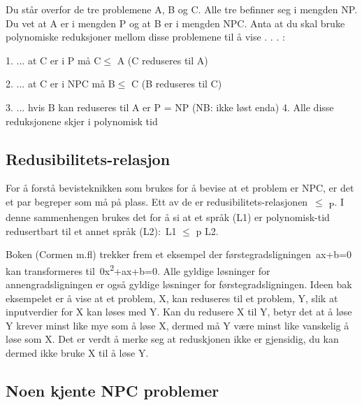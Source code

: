 \documentclass[12pt]{report}
\begin{document}

\par

Du står overfor de tre problemene A, B og C. Alle tre befinner seg i mengden NP. Du vet at A er i mengden P og at B er i mengden NPC. Anta at du skal bruke polynomiske reduksjoner mellom disse problemene til å vise . . . :\par

1. ... at C er i P må C$ \leq $ A (C reduseres til A)\par

2. ... at C er i NPC må B$ \leq $ C (B reduseres til C)\par

3. ... hvis B kan reduseres til A er P = NP (NB: ikke løst enda) 4. Alle disse reduksjonene skjer i polynomisk tid\par

\subsection*{Redusibilitets-relasjon}
For å forstå bevisteknikken som brukes for å bevise at et problem er NPC, er det et par begreper som må på plass. Ett av de er redusibilitets-relasjonen $ \leq $ \textsubscript{P}. I denne sammenhengen brukes det for å si at et språk (L1) er polynomisk-tid redusertbart til et annet språk (L2): L1 $ \leq $ p L2.\par

Boken (Cormen m.fl) trekker frem et eksempel der førstegradsligningen ax+b=0 kan transformeres til 0x\textsuperscript{2}+ax+b=0. Alle gyldige løsninger for annengradsligningen er også gyldige løsninger for førstegradsligningen. Ideen bak eksempelet er å vise at et problem, X, kan reduseres til et problem, Y, slik at inputverdier for X kan løses med Y. Kan du redusere X til Y, betyr det at å løse Y krever minst like mye som å løse X, dermed må Y være minst like vanskelig å løse som X. Det er verdt å merke seg at reduskjonen ikke er gjensidig, du kan dermed ikke bruke X til å løse Y.


\newpage
\par

\subsection*{Noen kjente NPC problemer}
\end{document}
